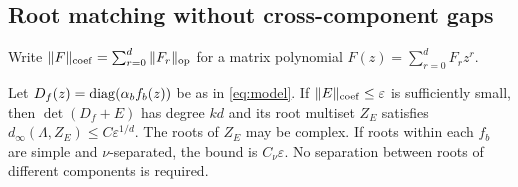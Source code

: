 \subsection{Root matching without cross-component gaps}
Write $\|F\|_{\rm coef}=\sum_{r=0}^d\|F_r\|_{\mathrm{op}}$ for a matrix
polynomial $F(z)=\sum_{r=0}^dF_rz^r$.
\begin{lemma}\label{lem:roots}
Let $D_f(z)=\operatorname{diag}(\alpha_bf_b(z))$ be as in \eqref{eq:model}.
If $\|E\|_{\rm coef}\le\varepsilon$ is sufficiently small, then
$\det(D_f+E)$ has degree $kd$ and its root multiset $Z_E$ satisfies
$d_\infty(\Lambda,Z_E)\le C\varepsilon^{1/d}$.
The roots of $Z_E$ may be complex. If roots within each $f_b$ are
simple and $\nu$-separated, the bound is $C_\nu\varepsilon$.
No separation between roots of different components is required.
\end{lemma}
